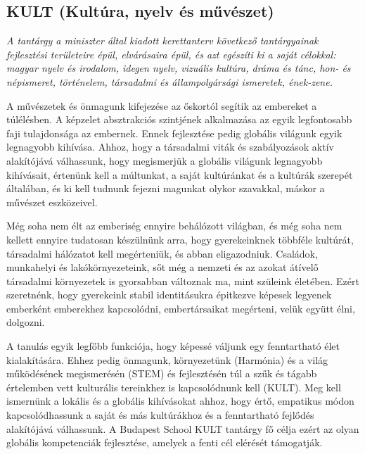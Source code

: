 \subsection[KULT]{KULT (Kultúra, nyelv és művészet)}
\emph{A tantárgy a miniszter által kiadott kerettanterv következő tantárgyainak
  fejlesztési területeire épül, elvárásaira épül, és azt egészíti ki a saját célokkal: magyar nyelv és irodalom, idegen
  nyelv, vizuális kultúra, dráma és tánc, hon- és népismeret, történelem,
  társadalmi és állampolgársági ismeretek, ének-zene.}

A művészetek és önmagunk kifejezése az őskortól segítik az embereket a
túlélésben. A képzelet absztrakciós szintjének alkalmazása az egyik
legfontosabb faji tulajdonsága az embernek. Ennek fejlesztése pedig globális
világunk egyik legnagyobb kihívása. Ahhoz, hogy a társadalmi viták és
szabályozások aktív alakítójává válhassunk, hogy megismerjük a globális
világunk legnagyobb kihívásait, értenünk kell a múltunkat, a saját kultúránkat
és a kultúrák szerepét általában, és ki kell tudnunk fejezni magunkat olykor
szavakkal, máskor a művészet eszközeivel.

Még soha nem élt az emberiség ennyire behálózott világban, és még soha nem
kellett ennyire tudatosan készülnünk arra, hogy gyerekeinknek többféle
kultúrát, társadalmi hálózatot kell megérteniük, és abban eligazodniuk.
Családok, munkahelyi és lakókörnyezeteink, sőt még a nemzeti és az azokat
átívelő társadalmi környezetek is gyorsabban változnak ma, mint szüleink
életében. Ezért szeretnénk, hogy gyerekeink stabil identitásukra épitkezve
képesek legyenek emberként emberekhez kapcsolódni, embertársaikat megérteni,
velük együtt élni, dolgozni.

A tanulás egyik legfőbb funkciója, hogy képessé váljunk egy fenntartható élet
kialakítására. Ehhez pedig önmagunk, környezetünk (Harmónia) és a világ
működésének megismerésén (STEM) és fejlesztésén túl a szűk és tágabb értelemben
vett kulturális tereinkhez is kapcsolódnunk kell (KULT). Meg kell ismernünk a
lokális és a globális kihívásokat ahhoz, hogy értő, empatikus módon
kapcsolódhassunk a saját és más kultúrákhoz és a fenntartható fejlődés
alakítójává válhassunk. A Budapest School KULT tantárgy fő célja ezért az olyan
globális kompetenciák fejlesztése, amelyek a fenti cél elérését támogatják.

